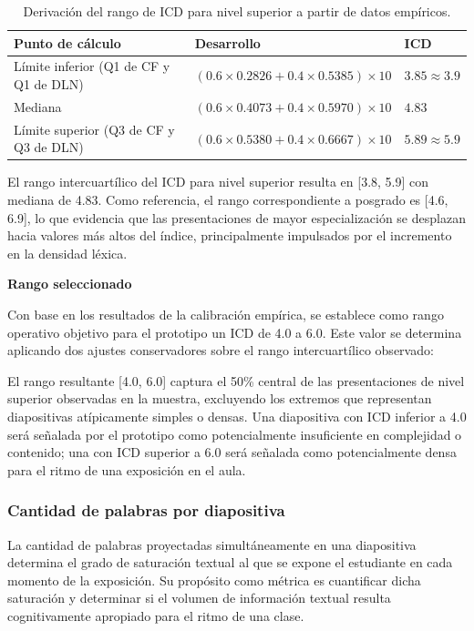 \documentclass[11pt]{article}
\begin{document}
\begin{table}[H]
    \centering
    \scriptsize
    \begin{tabular}{|p{3.1cm}|p{7.6cm}|p{2.3cm}|}
        \hline
        \textbf{Punto de cálculo} & \textbf{Desarrollo} & \textbf{ICD} \\
        \hline
        Límite inferior (Q1 de CF y Q1 de DLN) & $(0.6 \times 0.2826 + 0.4 \times 0.5385) \times 10$ & $3.85 \approx 3.9$ \\
        \hline
        Mediana & $(0.6 \times 0.4073 + 0.4 \times 0.5970) \times 10$ & $4.83$ \\
        \hline
        Límite superior (Q3 de CF y Q3 de DLN) & $(0.6 \times 0.5380 + 0.4 \times 0.6667) \times 10$ & $5.89 \approx 5.9$ \\
        \hline
    \end{tabular}
    \caption{Derivación del rango de ICD para nivel superior a partir de datos empíricos.}
\end{table}
El rango intercuartílico del ICD para nivel superior resulta en [3.8, 5.9] con mediana de 4.83. Como referencia, el rango correspondiente a posgrado es [4.6, 6.9], lo que evidencia que las presentaciones de mayor especialización se desplazan hacia valores más altos del índice, principalmente impulsados por el incremento en la densidad léxica.

\textbf{Rango seleccionado}

Con base en los resultados de la calibración empírica, se establece como rango operativo objetivo para el prototipo un ICD de 4.0 a 6.0. Este valor se determina aplicando dos ajustes conservadores sobre el rango intercuartílico observado:

El rango resultante [4.0, 6.0] captura el 50\% central de las presentaciones de nivel superior observadas en la muestra, excluyendo los extremos que representan diapositivas atípicamente simples o densas. Una diapositiva con ICD inferior a 4.0 será señalada por el prototipo como potencialmente insuficiente en complejidad o contenido; una con ICD superior a 6.0 será señalada como potencialmente densa para el ritmo de una exposición en el aula.


\subsubsection*{Cantidad de palabras por diapositiva}

La cantidad de palabras proyectadas simultáneamente en una diapositiva determina el grado de saturación textual al que se expone el estudiante en cada momento de la exposición. Su propósito como métrica es cuantificar dicha saturación y determinar si el volumen de información textual resulta cognitivamente apropiado para el ritmo de una clase.
\end{document}
